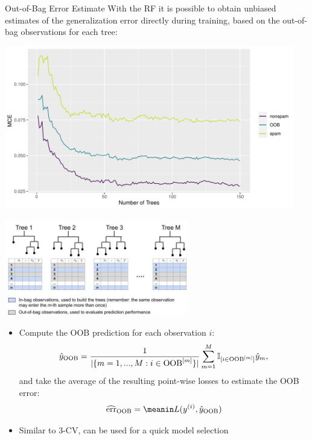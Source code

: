 \documentclass[11pt,compress,t,notes=noshow, xcolor=table]{beamer}
\newenvironment{knitrout}{}{} %
\begin{document}
\begin{vbframe}{Out-of-Bag Error Estimate}
With the RF it is possible to obtain unbiased estimates of the generalization error directly
during training, based on the out-of-bag observations for each tree:

\begin{knitrout}\scriptsize
{}\color{fgcolor}

{\centering \includegraphics[width=0.95\textwidth]{figure/cart_forest_intro_4} 

}



\end{knitrout}

\framebreak

\begin{center}
  \includegraphics[width=0.6\textwidth]{figure_man/forests-oob-error-corr}
\end{center}

\footnotesize

\begin{itemize}
  \item Compute the OOB prediction for each observation $i$:
  $$\hat{y}_{\text{OOB}} = \frac{1}{|\{m = 1, ..., M: i \in 
  \text{OOB}^{[m]} \}|} \sum_{m = 1}^{M} 
  \mathbb{I}_{[i \in \text{OOB}^{[m]}]} \hat{y}_m,$$
  and take the average of the resulting point-wise losses to estimate the OOB error:
  $$\widehat{\text{err}}_{\text{OOB}} = \meanin L(\yi, \yih_{\text{OOB}})$$
  \item Similar to 3-CV, can be used for a quick model selection
\end{itemize}


\end{vbframe}

\endlecture
\end{document}
